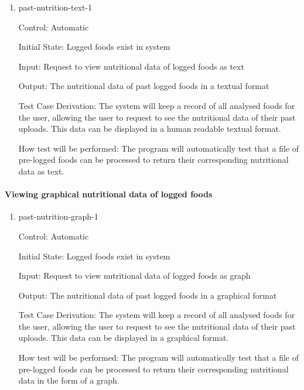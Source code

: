 \documentclass[12pt, titlepage]{article}
\begin{document}
	\begin{enumerate}
		
		\item{past-nutrition-text-1\\}
		
		Control: Automatic
		
		Initial State: Logged foods exist in system
		
		Input: Request to view nutritional data of logged foods as text
		
		Output: The nutritional data of past logged foods in a textual format
		
		Test Case Derivation: The system will keep a record of all analysed foods for the user, allowing the user to request to see the nutritional data of their past uploads. This data can be displayed in a human readable textual format.
		
		How test will be performed: The program will automatically test that a file of pre-logged foods can be processed to return their corresponding nutritional data as text.
		
	\end{enumerate}
	
	\paragraph{Viewing graphical nutritional data of logged foods}
	
	\begin{enumerate}
		
		\item{past-nutrition-graph-1\\}
		
		Control: Automatic
		
		Initial State: Logged foods exist in system
		
		Input: Request to view nutritional data of logged foods as graph
		
		Output: The nutritional data of past logged foods in a graphical format
		
		Test Case Derivation: The system will keep a record of all analysed foods for the user, allowing the user to request to see the nutritional data of their past uploads. This data can be displayed in a graphical format.
		
		How test will be performed: The program will automatically test that a file of pre-logged foods can be processed to return their corresponding nutritional data in the form of a graph.
		
	\end{enumerate}
	
\end{document}
